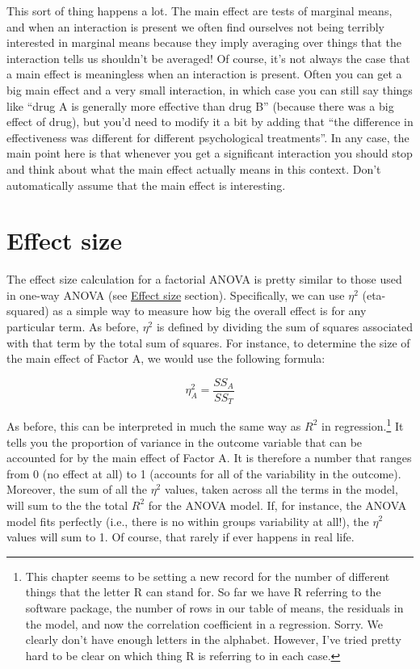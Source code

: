 \documentclass[
  a4paper,
]{book}
\begin{document}
This sort of thing happens a lot. The main effect are tests of marginal
means, and when an interaction is present we often find ourselves not
being terribly interested in marginal means because they imply averaging
over things that the interaction tells us shouldn't be averaged! Of
course, it's not always the case that a main effect is meaningless when
an interaction is present. Often you can get a big main effect and a
very small interaction, in which case you can still say things like
``drug A is generally more effective than drug B'' (because there was a
big effect of drug), but you'd need to modify it a bit by adding that
``the difference in effectiveness was different for different
psychological treatments''. In any case, the main point here is that
whenever you get a significant interaction you should stop and think
about what the main effect actually means in this context. Don't
automatically assume that the main effect is interesting.

\hypertarget{effect-size}{%
\section{Effect size}\label{effect-size}}

The effect size calculation for a factorial ANOVA is pretty similar to
those used in one-way ANOVA (see \protect\hyperlink{effect-size}{Effect
size} section). Specifically, we can use \(\eta^2\) (eta-squared) as a
simple way to measure how big the overall effect is for any particular
term. As before, \(\eta^2\) is defined by dividing the sum of squares
associated with that term by the total sum of squares. For instance, to
determine the size of the main effect of Factor A, we would use the
following formula:

\[\eta_A^2=\frac{SS_A}{SS_T}\]

As before, this can be interpreted in much the same way as \(R^2\) in
regression.\footnote{This chapter seems to be setting a new record for
  the number of different things that the letter R can stand for. So far
  we have R referring to the software package, the number of rows in our
  table of means, the residuals in the model, and now the correlation
  coefficient in a regression. Sorry. We clearly don't have enough
  letters in the alphabet. However, I've tried pretty hard to be clear
  on which thing R is referring to in each case.} It tells you the
proportion of variance in the outcome variable that can be accounted for
by the main effect of Factor A. It is therefore a number that ranges
from 0 (no effect at all) to 1 (accounts for all of the variability in
the outcome). Moreover, the sum of all the \(\eta^2\) values, taken
across all the terms in the model, will sum to the the total \(R^2\) for
the ANOVA model. If, for instance, the ANOVA model fits perfectly (i.e.,
there is no within groups variability at all!), the \(\eta^2\) values
will sum to 1. Of course, that rarely if ever happens in real life.
\end{document}

